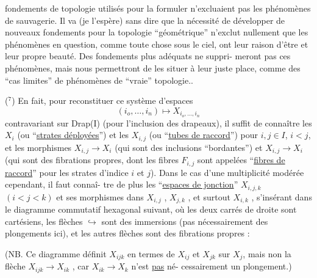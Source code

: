 
fondements de topologie utilisés pour la formuler n'excluaient
pas les phénomènes de sauvagerie. Il va (je l'espère) sans dire
que la nécessité de développer de nouveaux fondements pour la
topologie ``géométrique'' n'exclut nullement que les phénomènes en
question, comme toute chose sous le ciel, ont leur raison d'être
et leur propre beauté. Des fondements plus adéquats ne suppri-%
meront pas ces phénomènes, mais nous permettront de les situer à
leur juste place, comme des ``cas limites'' de phénomènes de ``vraie''
topologie..

($^7$) En fait, pour reconstituer ce système d'espaces
\[ (i_o,\ldots,i_n) \longmapsto X_{i_o,\ldots,i_n} \]
contravariant sur Drap(I) (pour l'inclusion des drapeaux), il
suffit de connaître les $X_i$ (ou ``\uline{strates déployées}'') et les $X_{i,j}$
(ou ``\uline{tubes de raccord}'') pour $i,j \in I$, $i < j$, et les morphismes
$X_{i,j} \longrightarrow X_i$ (qui sont des inclusions ``bordantes'') et $X_{i,j} \rightarrow X_i$
(qui sont des fibrations propres, dont les fibres $F_{i,j}$ sont
appelées ``\uline{fibres de raccord}'' pour les strates d'indice $i$ et $j$).
Dans le cas d'une multiplicité modérée cependant, il faut connaî-%
tre de plus les ``\uline{espaces de jonction}'' $X_{i,j,k}$ $(i < j < k)$ et ses
morphismes dans $X_{i,j}$ , $X_{j,k}$ , et surtout $X_{i,k}$ , s'insérant dans
le diagramme commutatif hexagonal suivant, où les deux carrés de
droite sont cartésiens, les flèches $\hookrightarrow$ sont des immersions (pas
nécessairement des plongements ici), et les autres flèches sont
des fibrations propres :


(NB. Ce diagramme définit $X_{ijk}$ en termes de $X_{ij}$ et $X_{jk}$ sur $X_j$,
mais non la flèche $X_{ijk} \longrightarrow X_{ik}$ , car $X_{ik} \longrightarrow X_k$ n'est \uline{pas} né-%
cessairement un plongement.)

